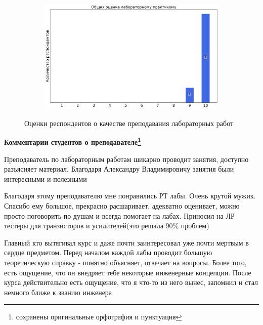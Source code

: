 \begin{figure}[H]
\begin{subfigure}[b]{0.45\textwidth}
			\end{subfigure}
			\begin{subfigure}[b]{0.45\textwidth}
				\centering
				\includegraphics[width=\textwidth]{images/3 course/Аналоговая электроника/labniks-marks-Неешпапа А.В.-3.png}
			\end{subfigure}	
			\caption{Оценки респондентов о качестве преподавания лабораторных работ}
		\end{figure}

		\textbf{Комментарии студентов о преподавателе\protect\footnote{сохранены оригинальные орфография и пунктуация}}
            \begin{commentbox} 
                Преподаватель по лабораторным работам шикарно проводит занятия, доступно разъясняет материал. Благодаря Александру Владимировичу занятия были интересными и полезными 
            \end{commentbox} 
        
            \begin{commentbox} 
                Благодаря этому преподавателю мне понравились РТ лабы. Очень крутой мужик. Спасибо ему большое, прекрасно расшаривает, адекватно оценивает, можно просто поговорить по душам и всегда помогает на лабах. Приносил на ЛР тестеры для транзисторов и усилителей(это решала 90\% проблем) 
            \end{commentbox} 
        
            \begin{commentbox} 
                Главный кто вытягивал курс и даже почти заинтересовал уже почти мертвым в сердце предметом. Перед началом каждой лабы проводит большую теоретическую справку - понятно объясняет, отвечает на вопросы. Более того, есть ощущение, что он внедряет тебе некоторые инженерные концепции. После курса действительно есть ощущение, что я что-то из него вынес, запомнил и стал немного ближе к званию инженера 
            \end{commentbox} 
        
